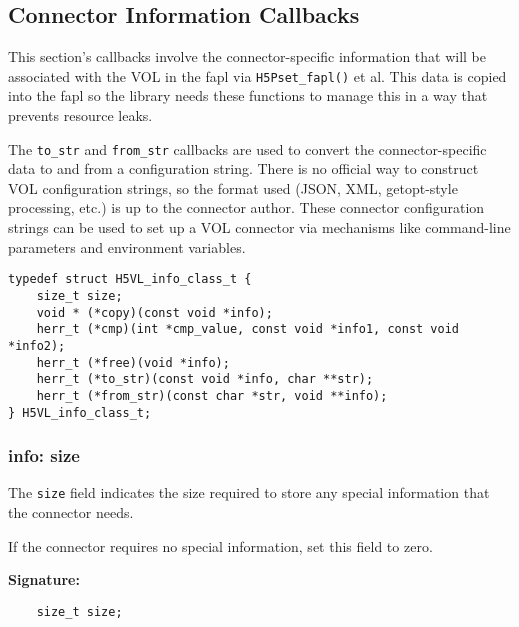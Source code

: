 
\subsection{Connector Information Callbacks}

This section's callbacks involve the connector-specific information that will be associated with the VOL in the fapl via \texttt{H5Pset\_fapl()} et al. This data is copied into the fapl so the library needs these functions to manage this in a way that prevents resource leaks.

The \texttt{to\_str} and \texttt{from\_str} callbacks are used to convert the connector-specific data to and from a configuration string. There is no official way to construct VOL configuration strings, so the format used (JSON, XML, getopt-style processing, etc.) is up to the connector author. These connector configuration strings can be used to set up a VOL connector via mechanisms like command-line parameters and environment variables.

\begin{lstlisting}[caption={Info class for connector information routines, H5VLconnector.h}, captionpos=b, label={lst:Infoclass}]
typedef struct H5VL_info_class_t {                                               
    size_t size;
    void * (*copy)(const void *info);
    herr_t (*cmp)(int *cmp_value, const void *info1, const void *info2);
    herr_t (*free)(void *info);
    herr_t (*to_str)(const void *info, char **str);
    herr_t (*from_str)(const char *str, void **info);
} H5VL_info_class_t;
\end{lstlisting}

\subsubsection{info: size}
The \texttt{size} field indicates the size required to store any special information that the connector needs.

If the connector requires no special information, set this field to zero.

\begin{mdframed}[style=bgbox]
\textbf{Signature:}
\begin{lstlisting}
    size_t size;
\end{lstlisting}
\end{mdframed}

